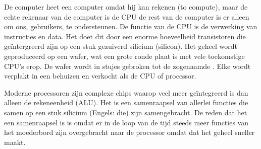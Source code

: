 De computer heet een computer omdat hij kan rekenen (to compute), maar de echte rekenaar van de computer is de CPU de rest van de computer is er alleen om ons, gebruikers, te ondersteunen. De functie van de CPU is de verwerking van instructies en data. Het doet dit door een enorme hoeveelheid transistoren die ge\"intergreerd zijn op een stuk gezuiverd silicium (silicon). Het geheel wordt geproduceerd op een wafer, wat een grote ronde plaat is met vele toekomstige CPU's erop. De wafer wordt in stujes gebroken tot de zogenaamde . Elke  wordt verplakt in een behuizen en verkocht als de CPU of processor.

Moderne processoren zijn complexe chips waarop veel meer  ge\"integreerd is dan alleen de rekeneenheid (ALU). Het is een samenraapsel van allerlei functies die samen op een stuk silicium (Engels: die) zijn samengebracht. De reden dat het een samenraapsel is is omdat er in de loop van de tijd steeds meer functies van het moederbord zijn overgebracht naar de processor omdat dat het geheel sneller maakt.

